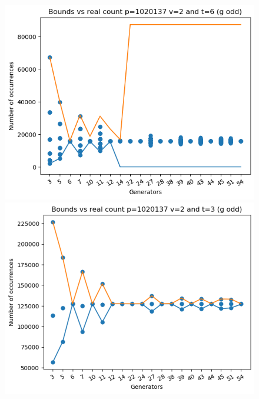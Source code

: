 \documentclass{article}
\begin{document}
\begin{figure}[H]
\begin{minipage}{.49\textwidth}
            \includegraphics[width=\textwidth]{../plots/tuples_figures/1020137v2godd/test_p1020137_v2_t6_g_odd.png}
    \end{minipage}
    \begin{minipage}{.49\textwidth}
            \centering
            \includegraphics[width=\textwidth]{../plots/tuples_figures/1020137v2godd/test_p1020137_v2_t3_g_odd.png}

\end{minipage}
\end{figure}
\end{document}
